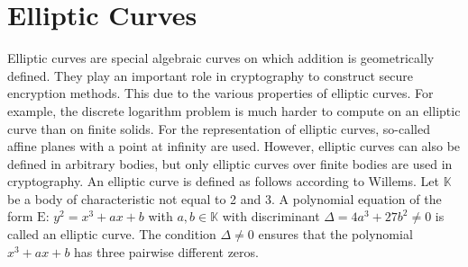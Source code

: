 \section{Elliptic Curves}
Elliptic curves are special algebraic curves on which addition is geometrically defined. They play an important role in cryptography to construct secure encryption methods. This due to the various properties of elliptic curves. For example, the discrete logarithm problem is much harder to compute on an elliptic curve than on finite solids.  
For the representation of elliptic curves, so-called affine planes with a point at infinity are used. 
However, elliptic curves can also be defined in arbitrary bodies, but only elliptic curves over finite bodies are used in cryptography.
\newline
\newline
An elliptic curve is defined as follows according to Willems.
\newline
Let \(\mathbb{K}\) be a body of characteristic not equal to 2 and 3. 
\newline
A polynomial equation of the form \(\text{E: }y^2 = x^3 + ax + b\) with \(a, b \in \mathbb{K}\) with discriminant \(\Delta = 4a^3 + 27b^2 \neq 0\) is called an elliptic curve.
\newline
The condition \(\Delta \neq 0\) ensures that the polynomial \(x^3 + ax + b\) has three pairwise different zeros.\cite{ellipticCurves}
\newpage
